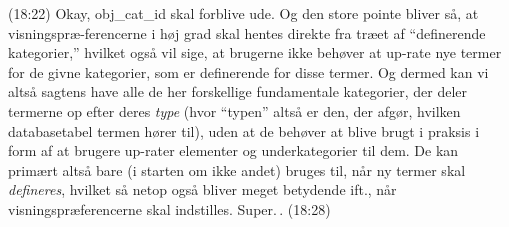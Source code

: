 \documentclass{report}
\begin{document}
(18:22) Okay, obj\_cat\_id skal forblive ude. Og den store pointe bliver så, at visningspræ-ferencerne i høj grad skal hentes direkte fra træet af ``definerende kategorier,'' hvilket også vil sige, at brugerne ikke behøver at up-rate nye termer for de givne kategorier, som er definerende for disse termer. Og dermed kan vi altså sagtens have alle de her forskellige fundamentale kategorier, der deler termerne op efter deres \emph{type} (hvor ``typen'' altså er den, der afgør, hvilken databasetabel termen hører til), uden at de behøver at blive brugt i praksis i form af at brugere up-rater elementer og underkategorier til dem. De kan primært altså bare (i starten om ikke andet) bruges til, når ny termer skal \emph{defineres}, hvilket så netop også bliver meget betydende ift., når visningspræferencerne skal indstilles. Super.\,. (18:28)

%
\end{document}
